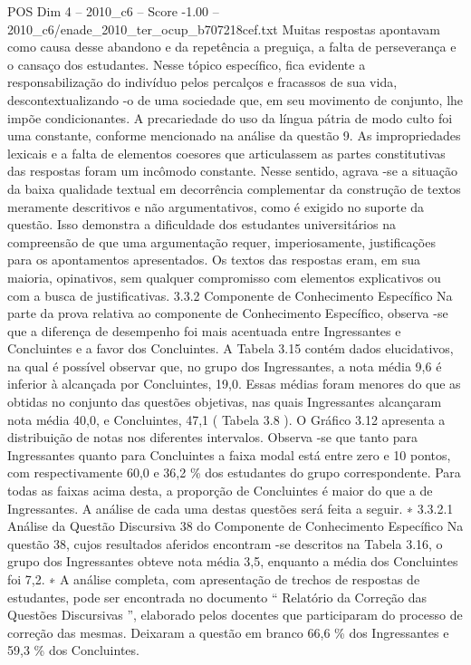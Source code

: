 \begin{textsample}{POS Dim 4 – 2010\_c6 – Score -1.00 – 2010\_c6/enade\_2010\_ter\_ocup\_b707218cef.txt}
Muitas respostas apontavam como causa desse abandono e da repetência a preguiça, a falta de perseverança e o cansaço dos estudantes.
Nesse tópico específico, fica evidente a responsabilização do indivíduo pelos percalços e fracassos de sua vida, descontextualizando -o de uma sociedade que, em seu movimento de conjunto, lhe impõe condicionantes.
A precariedade do uso da língua pátria de modo culto foi uma constante, conforme mencionado na análise da questão 9.
As impropriedades lexicais e a falta de elementos coesores que articulassem as partes constitutivas das respostas foram um incômodo constante.
Nesse sentido, agrava -se a situação da baixa qualidade textual em decorrência complementar da construção de textos meramente descritivos e não argumentativos, como é exigido no suporte da questão.
Isso demonstra a dificuldade dos estudantes universitários na compreensão de que uma argumentação requer, imperiosamente, justificações para os apontamentos apresentados.
Os textos das respostas eram, em sua maioria, opinativos, sem qualquer compromisso com elementos explicativos ou com a busca de justificativas. 3.3.2 Componente de Conhecimento Específico Na parte da prova relativa ao componente de Conhecimento Específico, observa -se que a diferença de desempenho foi mais acentuada entre Ingressantes e Concluintes e a favor dos Concluintes.
A Tabela 3.15 contém dados elucidativos, na qual é possível observar que, no grupo dos Ingressantes, a nota média 9,6 é inferior à alcançada por Concluintes, 19,0.
Essas médias foram menores do que as obtidas no conjunto das questões objetivas, nas quais Ingressantes alcançaram nota média 40,0, e Concluintes, 47,1 ( Tabela 3.8 ).
O Gráfico 3.12 apresenta a distribuição de notas nos diferentes intervalos.
Observa -se que tanto para Ingressantes quanto para Concluintes a faixa modal está entre zero e 10 pontos, com respectivamente 60,0 e 36,2 \% dos estudantes do grupo correspondente.
Para todas as faixas acima desta, a proporção de Concluintes é maior do que a de Ingressantes.
A análise de cada uma destas questões será feita a seguir. ∗ 3.3.2.1 Análise da Questão Discursiva 38 do Componente de Conhecimento Específico Na questão 38, cujos resultados aferidos encontram -se descritos na Tabela 3.16, o grupo dos Ingressantes obteve nota média 3,5, enquanto a média dos Concluintes foi 7,2. ∗ A análise completa, com apresentação de trechos de respostas de estudantes, pode ser encontrada no documento “ Relatório da Correção das Questões Discursivas ”, elaborado pelos docentes que participaram do processo de correção das mesmas.
Deixaram a questão em branco 66,6 \% dos Ingressantes e 59,3 \% dos Concluintes.

\end{textsample}
